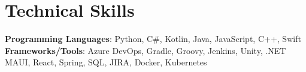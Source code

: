 \section{Technical Skills}
 \begin{itemize}[leftmargin=0.15in, label={}]
    \small{\item{
      \textbf{Programming Languages}{: Python, C\#, Kotlin, Java, JavaScript, C++, Swift } \\
     \textbf{Frameworks/Tools}{: Azure DevOps, Gradle, Groovy, Jenkins, Unity, .NET MAUI, React, Spring, SQL, JIRA, Docker, Kubernetes }\\
    }}
 \end{itemize}